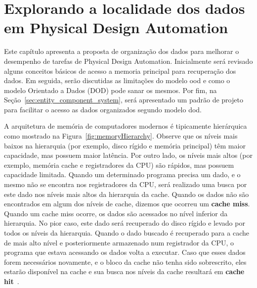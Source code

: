 \acresetall{}
\chapter{Explorando a localidade dos dados em Physical Design Automation}
\label{cap:tecnica_proposta}

Este capítulo apresenta a proposta de organização dos dados para melhorar o desempenho de tarefas de Physical Design Automation.
Inicialmente será revisado alguns conceitos básicos de acesso a memoria principal para recuperação dos dados.
Em seguida, serão discutidas as limitações do modelo \ac{ood} e como o modelo Orientado a Dados (DOD) pode sanar os mesmos.
Por fim, na Seção~\ref{sec:entity_component_system}, será apresentado um padrão de projeto para facilitar o acesso as dados organizados segundo modelo \ac{dod}.

A arquitetura de memória de computadores modernos é tipicamente hierárquica como mostrado na Figura~\ref{fig:memoryHierarchy}. Observe que os níveis mais baixos na hierarquia (por exemplo, disco rígido e memória principal) têm maior capacidade, mas possuem maior latência. Por outro lado, os níveis mais altos (por exemplo, memória cache e registradores da CPU) são rápidos, mas possuem capacidade limitada. Quando um determinado programa precisa um dado, e o mesmo não se encontra nos registradores da CPU, será realizado uma busca por este dado nos níveis mais altos da hierarquia da  cache. Quando os dados não são encontrados em algum dos níveis de cache, dizemos que ocorreu um \textbf{cache miss}. Quando um cache miss ocorre, os dados são acessados no nível inferior da hierarquia. No pior caso, este dado será recuperado do disco rígido e levado por todos os níveis da hierarquia. Quando o dado buscado é recuperado para a cache de mais alto nível e posteriormente armazenado num registrador da CPU, o programa que estava acessando os dados volta a executar. Caso que esses dados forem necessários novamente, e o bloco da cache não tenha sido sobrescrito, eles estarão disponível na cache e sua busca nos níveis da cache resultará em \textbf{cache hit}~\cite{patterson2013computer}.

